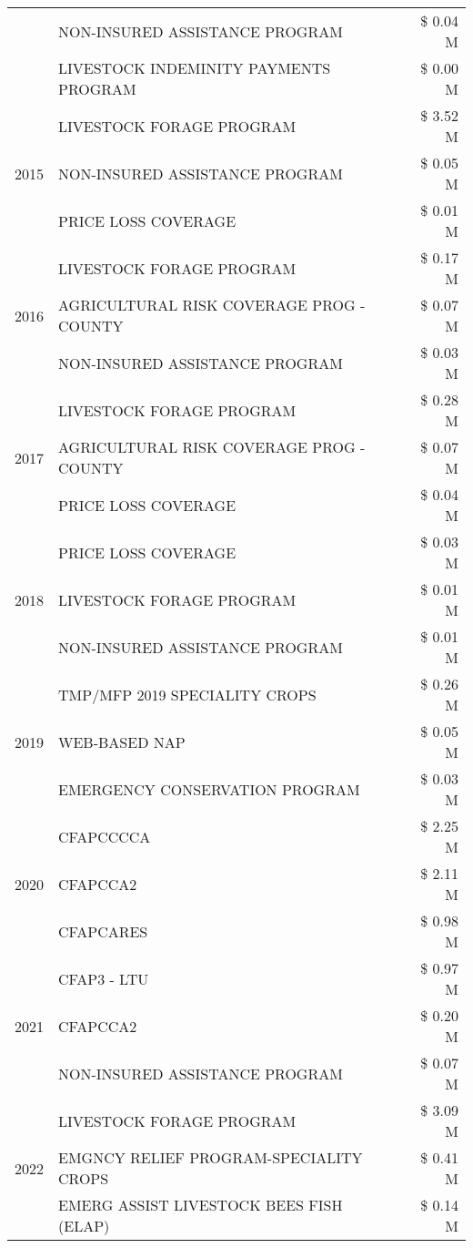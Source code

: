 \begin{tabular}{llr}
 & NON-INSURED ASSISTANCE PROGRAM & \$ 0.04 M \\
 & LIVESTOCK INDEMINITY PAYMENTS PROGRAM & \$ 0.00 M \\
\cline{1-3}
\multirow[t]{3}{*}{2015} & LIVESTOCK FORAGE PROGRAM & \$ 3.52 M \\
 & NON-INSURED ASSISTANCE PROGRAM & \$ 0.05 M \\
 & PRICE LOSS COVERAGE & \$ 0.01 M \\
\cline{1-3}
\multirow[t]{3}{*}{2016} & LIVESTOCK FORAGE PROGRAM & \$ 0.17 M \\
 & AGRICULTURAL RISK COVERAGE PROG - COUNTY & \$ 0.07 M \\
 & NON-INSURED ASSISTANCE PROGRAM & \$ 0.03 M \\
\cline{1-3}
\multirow[t]{3}{*}{2017} & LIVESTOCK FORAGE PROGRAM & \$ 0.28 M \\
 & AGRICULTURAL RISK COVERAGE PROG - COUNTY & \$ 0.07 M \\
 & PRICE LOSS COVERAGE & \$ 0.04 M \\
\cline{1-3}
\multirow[t]{3}{*}{2018} & PRICE LOSS COVERAGE & \$ 0.03 M \\
 & LIVESTOCK FORAGE PROGRAM & \$ 0.01 M \\
 & NON-INSURED ASSISTANCE PROGRAM & \$ 0.01 M \\
\cline{1-3}
\multirow[t]{3}{*}{2019} & TMP/MFP 2019 SPECIALITY CROPS & \$ 0.26 M \\
 & WEB-BASED NAP & \$ 0.05 M \\
 & EMERGENCY CONSERVATION PROGRAM & \$ 0.03 M \\
\cline{1-3}
\multirow[t]{3}{*}{2020} & CFAPCCCCA & \$ 2.25 M \\
 & CFAPCCA2 & \$ 2.11 M \\
 & CFAPCARES & \$ 0.98 M \\
\cline{1-3}
\multirow[t]{3}{*}{2021} & CFAP3 - LTU & \$ 0.97 M \\
 & CFAPCCA2 & \$ 0.20 M \\
 & NON-INSURED ASSISTANCE PROGRAM & \$ 0.07 M \\
\cline{1-3}
\multirow[t]{3}{*}{2022} & LIVESTOCK FORAGE PROGRAM & \$ 3.09 M \\
 & EMGNCY RELIEF PROGRAM-SPECIALITY CROPS & \$ 0.41 M \\
 & EMERG ASSIST LIVESTOCK BEES FISH (ELAP) & \$ 0.14 M \\
\cline{1-3}
\bottomrule
\end{tabular}
